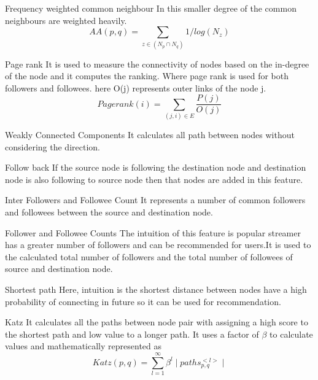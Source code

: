\documentclass{beamer}
\begin{document}
\begin{frame}
\begin{block}{Frequency weighted common neighbour}
In this smaller degree of the common neighbours are weighted heavily.
$$AA(p,q)=\sum_{z \in (N_{p}\cap N_{q})}1/log(N_{z})$$
\end{block}
\begin{block}{Page rank}
It is used to measure the connectivity of nodes based on the in-degree of the node and it computes the ranking. Where page rank is used for both followers and followees.
here O(j) represents outer links of the node j. 
$$Pagerank(i)=\sum_{(j,i)\in E}\frac{P(j)}{O(j)}$$
\end{block}
\end{frame}
\begin{frame}
\begin{block}{Weakly Connected Components}
It calculates all path 
between nodes without considering the direction.
\end{block}
\begin{block}{Follow back}
If the source node is following the destination node and destination node is also following to source node then that nodes are added in this feature.
\end{block}
\begin{block}{Inter Followers and Followee Count}
It represents a number of common followers and followees between the source and destination node.
\end{block}
\begin{block}{Follower and Followee Counts}
The intuition of this feature is 
popular streamer has a greater number of followers and can be recommended for users.It is used to the calculated 
total number of followers and the total number of followees of source and destination node.
\end{block}
\end{frame}
\begin{frame}
    \begin{block}{Shortest path}
    Here, intuition is the shortest distance between nodes have a high probability of connecting in future so it can be used for recommendation.
    \end{block}
    \begin{block}{Katz}
    It calculates all the paths between node pair with assigning a high score to the shortest path and low value to a longer path. It uses a factor of $\beta$ to calculate values and mathematically represented as
    $$Katz\left(p,q\right)=\sum_{l=1}^{\infty}\beta^{l}\mid paths_{p,q}^{<l>}\mid$$ 
    \end{block}
\end{frame}
\end{document}
